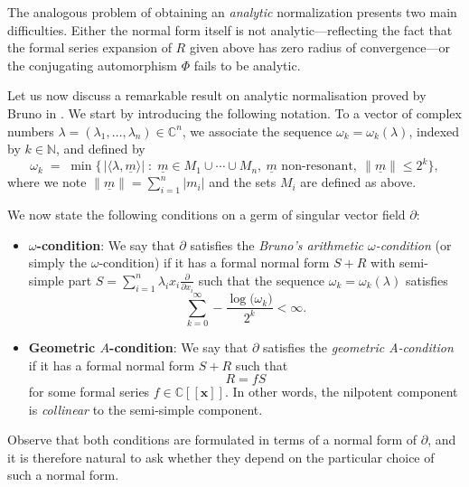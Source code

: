 \documentclass[10pt,twoside,reqno]{amsart}
\theoremstyle{remark}
\theoremstyle{remark}
\newcommand{\N}{\mathbb{N}}
\newcommand{\C}{\mathbb{C}}
\newcommand{\um}{{\underline m}}
\newcommand{\x}{\mathbf{x}}
\begin{document}
The analogous problem of obtaining an {\em analytic} normalization presents two main difficulties. Either the normal form itself is not analytic—reflecting the fact that the formal series expansion of $R$ given above has zero radius of convergence—or the conjugating automorphism $\Phi$ fails to be analytic.

Let us now discuss a remarkable result on analytic normalisation proved by Bruno in \cite{Bruno1971_1972}.   
We start by introducing the following notation. To a vector of complex numbers $\lambda = (\lambda_1,\ldots,\lambda_n)\in \C^n$, 
we associate the sequence $\omega_k = \omega_k(\lambda)$, indexed by $k\in \N$, and defined by
\[
\omega_k \;=\; \min \bigl\{\, |\langle \lambda, \underline{m} \rangle| \;:\;
\underline{m} \in M_1 \cup \cdots \cup M_n,\ 
\underline{m} \text{ non-resonant},\ 
\|\underline{m}\| \le 2^k \bigr\},
\]
where we note $\| \um \| = \sum_{i=1}^{n} |m_i|$ and the sets $M_i$ are defined as above. 

We now state the following conditions on a germ of singular vector field $\partial$:
\begin{itemize}
\item[] \textbf{$\omega$-condition}:
We say that  $\partial$ satisfies the  {\em Bruno's arithmetic $\omega$-condition} (or simply the $\omega$-condition) if it has a formal normal form $S+R$ with semi-simple part
$S = \sum_{i=1}^n \lambda_ix_i \frac{\partial}{\partial x_i}$ such that the sequence $\omega_k=\omega_k(\lambda)$ satisfies
\[ 
\sum_{k=0}^{\infty} -\frac{\log \bigl( \omega_k\bigr)}{2^k} < \infty.
\]
\item[] \textbf{Geometric $A$-condition}: We say that  $\partial$ satisfies the {\em geometric A-condition} if it has a formal normal form $S+R$ such that 
$$R=f S$$
for some formal series $f \in \mathbb{C} [[\x]]$. In other words, the nilpotent component is {\em collinear} to the semi-simple component. 
\end{itemize}
Observe that both conditions are formulated in terms of a normal form of $\partial$, and it is therefore natural to ask whether they depend on the particular choice of such a normal form.
\end{document}
